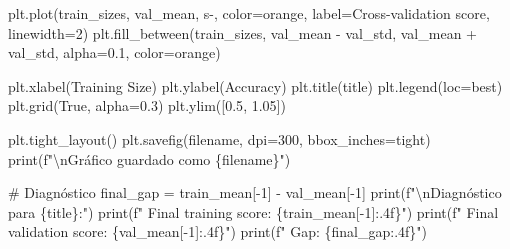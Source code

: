 \documentclass[
  doc,
  floatsintext,
  longtable,
  a4paper,
  nolmodern,
  notxfonts,
  notimes,
  12pt,
  colorlinks=true,linkcolor=blue,citecolor=blue,urlcolor=blue]{apa7}
\newenvironment{Shaded}{\begin{snugshade}}{\end{snugshade}}
\newcommand{\BuiltInTok}[1]{\textcolor[rgb]{0.00,0.23,0.31}{#1}}
\newcommand{\CharTok}[1]{\textcolor[rgb]{0.13,0.47,0.30}{#1}}
\newcommand{\CommentTok}[1]{\textcolor[rgb]{0.37,0.37,0.37}{#1}}
\newcommand{\DecValTok}[1]{\textcolor[rgb]{0.68,0.00,0.00}{#1}}
\newcommand{\FloatTok}[1]{\textcolor[rgb]{0.68,0.00,0.00}{#1}}
\newcommand{\NormalTok}[1]{\textcolor[rgb]{0.00,0.23,0.31}{#1}}
\newcommand{\OperatorTok}[1]{\textcolor[rgb]{0.37,0.37,0.37}{#1}}
\newcommand{\SpecialCharTok}[1]{\textcolor[rgb]{0.37,0.37,0.37}{#1}}
\newcommand{\SpecialStringTok}[1]{\textcolor[rgb]{0.13,0.47,0.30}{#1}}
\newcommand{\StringTok}[1]{\textcolor[rgb]{0.13,0.47,0.30}{#1}}
\newcommand{\VariableTok}[1]{\textcolor[rgb]{0.07,0.07,0.07}{#1}}
\begin{document}
\begin{Shaded}
\begin{Highlighting}[]
\NormalTok{    plt.plot(train\_sizes, val\_mean, }\StringTok{\textquotesingle{}s{-}\textquotesingle{}}\NormalTok{, color}\OperatorTok{=}\StringTok{\textquotesingle{}orange\textquotesingle{}}\NormalTok{,}
\NormalTok{             label}\OperatorTok{=}\StringTok{\textquotesingle{}Cross{-}validation score\textquotesingle{}}\NormalTok{, linewidth}\OperatorTok{=}\DecValTok{2}\NormalTok{)}
\NormalTok{    plt.fill\_between(train\_sizes, val\_mean }\OperatorTok{{-}}\NormalTok{ val\_std,}
\NormalTok{                     val\_mean }\OperatorTok{+}\NormalTok{ val\_std, alpha}\OperatorTok{=}\FloatTok{0.1}\NormalTok{, color}\OperatorTok{=}\StringTok{\textquotesingle{}orange\textquotesingle{}}\NormalTok{)}
    
\NormalTok{    plt.xlabel(}\StringTok{\textquotesingle{}Training Size\textquotesingle{}}\NormalTok{)}
\NormalTok{    plt.ylabel(}\StringTok{\textquotesingle{}Accuracy\textquotesingle{}}\NormalTok{)}
\NormalTok{    plt.title(title)}
\NormalTok{    plt.legend(loc}\OperatorTok{=}\StringTok{\textquotesingle{}best\textquotesingle{}}\NormalTok{)}
\NormalTok{    plt.grid(}\VariableTok{True}\NormalTok{, alpha}\OperatorTok{=}\FloatTok{0.3}\NormalTok{)}
\NormalTok{    plt.ylim([}\FloatTok{0.5}\NormalTok{, }\FloatTok{1.05}\NormalTok{])}
    
\NormalTok{    plt.tight\_layout()}
\NormalTok{    plt.savefig(filename, dpi}\OperatorTok{=}\DecValTok{300}\NormalTok{, bbox\_inches}\OperatorTok{=}\StringTok{\textquotesingle{}tight\textquotesingle{}}\NormalTok{)}
    \BuiltInTok{print}\NormalTok{(}\SpecialStringTok{f"}\CharTok{\textbackslash{}n}\SpecialStringTok{Gráfico guardado como \textquotesingle{}}\SpecialCharTok{\{}\NormalTok{filename}\SpecialCharTok{\}}\SpecialStringTok{\textquotesingle{}"}\NormalTok{)}
    
    \CommentTok{\# Diagnóstico}
\NormalTok{    final\_gap }\OperatorTok{=}\NormalTok{ train\_mean[}\OperatorTok{{-}}\DecValTok{1}\NormalTok{] }\OperatorTok{{-}}\NormalTok{ val\_mean[}\OperatorTok{{-}}\DecValTok{1}\NormalTok{]}
    \BuiltInTok{print}\NormalTok{(}\SpecialStringTok{f"}\CharTok{\textbackslash{}n}\SpecialStringTok{Diagnóstico para }\SpecialCharTok{\{}\NormalTok{title}\SpecialCharTok{\}}\SpecialStringTok{:"}\NormalTok{)}
    \BuiltInTok{print}\NormalTok{(}\SpecialStringTok{f"  Final training score: }\SpecialCharTok{\{}\NormalTok{train\_mean[}\OperatorTok{{-}}\DecValTok{1}\NormalTok{]}\SpecialCharTok{:.4f\}}\SpecialStringTok{"}\NormalTok{)}
    \BuiltInTok{print}\NormalTok{(}\SpecialStringTok{f"  Final validation score: }\SpecialCharTok{\{}\NormalTok{val\_mean[}\OperatorTok{{-}}\DecValTok{1}\NormalTok{]}\SpecialCharTok{:.4f\}}\SpecialStringTok{"}\NormalTok{)}
    \BuiltInTok{print}\NormalTok{(}\SpecialStringTok{f"  Gap: }\SpecialCharTok{\{}\NormalTok{final\_gap}\SpecialCharTok{:.4f\}}\SpecialStringTok{"}\NormalTok{)}
    

\end{Highlighting}
\end{Shaded}
\end{document}
